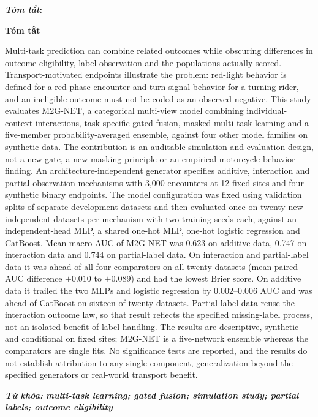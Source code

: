 \documentclass[9pt, conference, a4paper, compsocconf]{IEEEtran}
\makeatletter
\renewenvironment{abstract}
  {\normalfont
   \if@twocolumn
     \@IEEEabskeysecsize\bfseries\textit{\abstractname}: 
   \else
     \begin{center}\@IEEEabskeysecsize\textbf{\abstractname}\end{center}
     \@IEEEabskeysecsize
     \setlength{\parindent}{0pt}   %
     \noindent
   \fi}
  {\par}
\renewenvironment{abstract}
  {\normalfont
   \@IEEEabskeysecsize
   \setlength{\parindent}{0pt}
   \noindent
   \if@twocolumn
     \bfseries\textit{\abstractname}: 
   \else
     \begin{center}\textbf{\abstractname}\end{center}
   \fi}
  {\par}
\renewenvironment{IEEEkeywords}
  {\normalfont
   \@IEEEabskeysecsize
   \vspace{0.3em}       
   \setlength{\parindent}{0pt}
   \noindent
   {\bfseries\itshape \IEEEkeywordsname: }\ignorespaces}
  {\par}
\renewcommand{\abstractname}{Tóm tắt}
\renewcommand{\IEEEkeywordsname}{Từ khóa}
\makeatother
\begin{document}
\begin{abstract}
Multi-task prediction can combine related outcomes while obscuring differences in outcome eligibility, label observation and the populations actually scored. Transport-motivated endpoints illustrate the problem: red-light behavior is defined for a red-phase encounter and turn-signal behavior for a turning rider, and an ineligible outcome must not be coded as an observed negative. This study evaluates M2G-NET, a categorical multi-view model combining individual-context interactions, task-specific gated fusion, masked multi-task learning and a five-member probability-averaged ensemble, against four other model families on synthetic data. The contribution is an auditable simulation and evaluation design, not a new gate, a new masking principle or an empirical motorcycle-behavior finding. An architecture-independent generator specifies additive, interaction and partial-observation mechanisms with 3,000 encounters at 12 fixed sites and four synthetic binary endpoints. The model configuration was fixed using validation splits of separate development datasets and then evaluated once on twenty new independent datasets per mechanism with two training seeds each, against an independent-head MLP, a shared one-hot MLP, one-hot logistic regression and CatBoost. Mean macro AUC of M2G-NET was 0.623 on additive data, 0.747 on interaction data and 0.744 on partial-label data. On interaction and partial-label data it was ahead of all four comparators on all twenty datasets (mean paired AUC difference $+0.010$ to $+0.089$) and had the lowest Brier score. On additive data it trailed the two MLPs and logistic regression by $0.002$--$0.006$ AUC and was ahead of CatBoost on sixteen of twenty datasets. Partial-label data reuse the interaction outcome law, so that result reflects the specified missing-label process, not an isolated benefit of label handling. The results are descriptive, synthetic and conditional on fixed sites; M2G-NET is a five-network ensemble whereas the comparators are single fits. No significance tests are reported, and the results do not establish attribution to any single component, generalization beyond the specified generators or real-world transport benefit.
\end{abstract}

\begin{IEEEkeywords}
\textbf{\textit{multi-task learning; gated fusion; simulation study; partial labels; outcome eligibility
}}
\end{IEEEkeywords}
\end{document}
